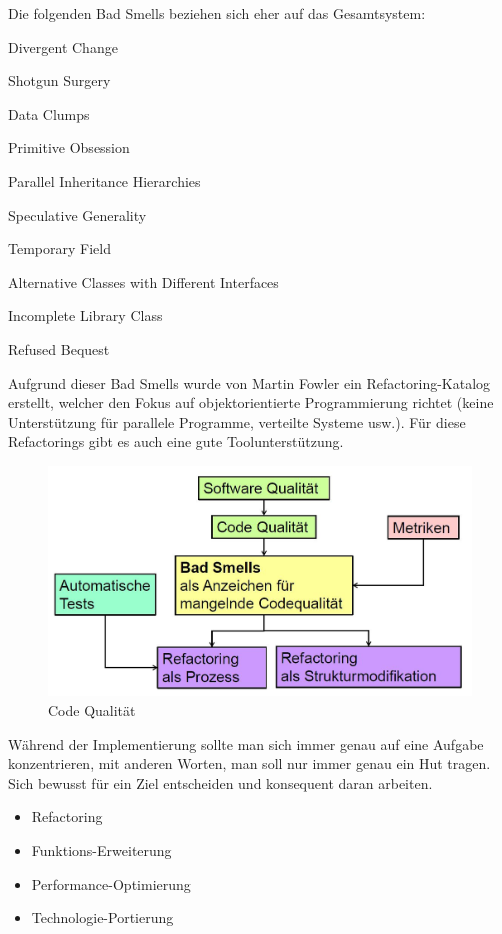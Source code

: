 Die folgenden Bad Smells beziehen sich eher auf das Gesamtsystem:
\begin{multicols}{2}
\begin{description}
	\item Divergent Change
	\item Shotgun Surgery
	\item Data Clumps
	\item Primitive Obsession
	\item Parallel Inheritance Hierarchies
	\item Speculative Generality
	\item Temporary Field
	\item Alternative Classes with Different Interfaces
	\item Incomplete Library Class
	\item Refused Bequest
\end{description}
\end{multicols}
Aufgrund dieser Bad Smells wurde von Martin Fowler ein Refactoring-Katalog erstellt, welcher den Fokus auf objektorientierte Programmierung richtet (keine Unterstützung für parallele Programme, verteilte Systeme usw.). Für diese Refactorings gibt es auch eine gute Toolunterstützung. 

\begin{figure}
	\centering
	\includegraphics[width=0.7\linewidth]{fig/fazit-refactoring}
	\caption{Code Qualität}
	\label{fig:fazit-refactoring}
\end{figure}

\newpage

Während der Implementierung sollte man sich immer genau auf eine Aufgabe konzentrieren, mit anderen Worten, man soll nur immer genau ein Hut tragen. Sich bewusst für ein Ziel entscheiden und konsequent daran arbeiten.

\begin{itemize}
	\item Refactoring
	\item Funktions-Erweiterung
	\item Performance-Optimierung
	\item Technologie-Portierung
\end{itemize}

